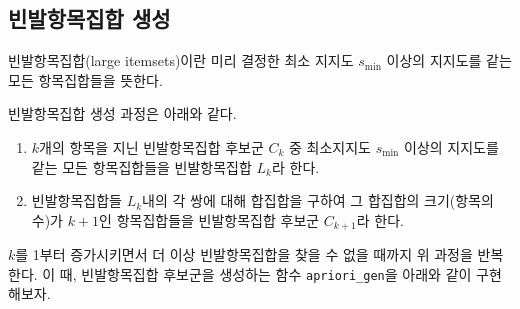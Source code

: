 \documentclass[
]{book}
\providecommand{\tightlist}{%
  \setlength{\itemsep}{0pt}\setlength{\parskip}{0pt}}
\begin{document}
\hypertarget{apriori-large-itemsets}{%
\subsection{빈발항목집합 생성}\label{apriori-large-itemsets}}

빈발항목집합(large itemsets)이란 미리 결정한 최소 지지도 \(s_{\text{min}}\) 이상의 지지도를 같는 모든 항목집합들을 뜻한다.

빈발항목집합 생성 과정은 아래와 같다.

\begin{enumerate}
\def\labelenumi{\arabic{enumi}.}
\tightlist
\item
  \(k\)개의 항목을 지닌 빈발항목집합 후보군 \(C_{k}\) 중 최소지지도 \(s_{\text{min}}\) 이상의 지지도를 같는 모든 항목집합들을 빈발항목집합 \(L_{k}\)라 한다.
\item
  빈발항목집합들 \(L_{k}\)내의 각 쌍에 대해 합집합을 구하여 그 합집합의 크기(항목의 수)가 \(k + 1\)인 항목집합들을 빈발항목집합 후보군 \(C_{k + 1}\)라 한다.
\end{enumerate}

\(k\)를 1부터 증가시키면서 더 이상 빈발항목집합을 찾을 수 없을 때까지 위 과정을 반복한다. 이 때, 빈발항목집합 후보군을 생성하는 함수 \texttt{apriori\_gen}을 아래와 같이 구현해보자.
\end{document}
